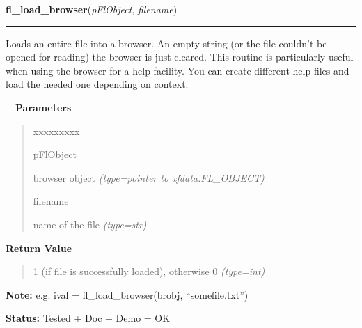 \hspace{.8\funcindent}\begin{boxedminipage}{\funcwidth}

    \raggedright \textbf{fl\_load\_browser}(\textit{pFlObject}, \textit{filename})

    \vspace{-1.5ex}

    \rule{\textwidth}{0.5\fboxrule}
\setlength{\parskip}{2ex}

Loads an entire file into a browser. An empty string (or the file
couldn't be opened for reading) the browser is just cleared. This
routine is particularly useful when using the browser for a help
facility. You can create different help files and load the needed one
depending on context.

-{}-
\setlength{\parskip}{1ex}
      \textbf{Parameters}
      \vspace{-1ex}

      \begin{quote}
        \begin{Ventry}{xxxxxxxxx}

          \item[pFlObject]


browser object
            {\it (type=pointer to xfdata.FL\_OBJECT)}

          \item[filename]


name of the file
            {\it (type=str)}

        \end{Ventry}

      \end{quote}

      \textbf{Return Value}
    \vspace{-1ex}

      \begin{quote}

1 (if file is successfully loaded), otherwise 0
      {\it (type=int)}

      \end{quote}

\textbf{Note:} 
e.g. ival = fl\_load\_browser(brobj, ``somefile.txt'')


\textbf{Status:} 
Tested + Doc + Demo = OK


    \end{boxedminipage}

    \label{xformslib:flbrowser:fl_select_browser_line}

